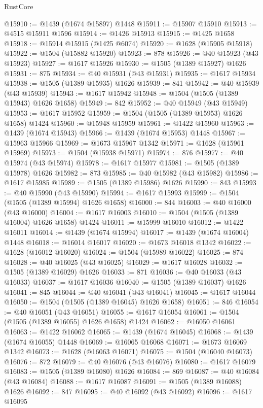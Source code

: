 \begin{lexlean}{RustCore}
\begin{coremodule}
@15910 := @1439 (@1674 @15897) @1448
@15911 := @15907 @15910
@15913 := @4515 @15911 @1596
@15914 := @1426 @15913
@15915 := @1425 @1658
@15918 := @15914 @15915 (@1425 @6074)
@15920 := @1628 (@15905 @15918)
@15922 := @1504 (@15882 @15920)
@15923 := 878
@15926 := @40 @15923 (@43 @15923)
@15927 := @1617 @15926
@15930 := @1505 (@1389 @15927) @1626
@15931 := 875
@15934 := @40 @15931 (@43 @15931)
@15935 := @1617 @15934
@15938 := @1505 (@1389 @15935) @1626
@15939 := 841
@15942 := @40 @15939 (@43 @15939)
@15943 := @1617 @15942
@15948 := @1504 (@1505 (@1389 @15943) @1626 @1658)
@15949 := 842
@15952 := @40 @15949 (@43 @15949)
@15953 := @1617 @15952
@15959 := @1504 (@1505 (@1389 @15953) @1626 @1658) @1424
@15960 := @15948 @15959
@15961 := @1422 @15960
@15963 := @1439 (@1674 @15943)
@15966 := @1439 (@1674 @15953) @1448
@15967 := @15963 @15966
@15969 := @1673 @15967 @1342
@15971 := @1628 (@15961 @15969)
@15973 := @1504 (@15938 @15971)
@15974 := 876
@15977 := @40 @15974 (@43 @15974)
@15978 := @1617 @15977
@15981 := @1505 (@1389 @15978) @1626
@15982 := 873
@15985 := @40 @15982 (@43 @15982)
@15986 := @1617 @15985
@15989 := @1505 (@1389 @15986) @1626
@15990 := 843
@15993 := @40 @15990 (@43 @15990)
@15994 := @1617 @15993
@15999 := @1504 (@1505 (@1389 @15994) @1626 @1658)
@16000 := 844
@16003 := @40 @16000 (@43 @16000)
@16004 := @1617 @16003
@16010 := @1504 (@1505 (@1389 @16004) @1626 @1658) @1424
@16011 := @15999 @16010
@16012 := @1422 @16011
@16014 := @1439 (@1674 @15994)
@16017 := @1439 (@1674 @16004) @1448
@16018 := @16014 @16017
@16020 := @1673 @16018 @1342
@16022 := @1628 (@16012 @16020)
@16024 := @1504 (@15989 @16022)
@16025 := 874
@16028 := @40 @16025 (@43 @16025)
@16029 := @1617 @16028
@16032 := @1505 (@1389 @16029) @1626
@16033 := 871
@16036 := @40 @16033 (@43 @16033)
@16037 := @1617 @16036
@16040 := @1505 (@1389 @16037) @1626
@16041 := 845
@16044 := @40 @16041 (@43 @16041)
@16045 := @1617 @16044
@16050 := @1504 (@1505 (@1389 @16045) @1626 @1658)
@16051 := 846
@16054 := @40 @16051 (@43 @16051)
@16055 := @1617 @16054
@16061 := @1504 (@1505 (@1389 @16055) @1626 @1658) @1424
@16062 := @16050 @16061
@16063 := @1422 @16062
@16065 := @1439 (@1674 @16045)
@16068 := @1439 (@1674 @16055) @1448
@16069 := @16065 @16068
@16071 := @1673 @16069 @1342
@16073 := @1628 (@16063 @16071)
@16075 := @1504 (@16040 @16073)
@16076 := 872
@16079 := @40 @16076 (@43 @16076)
@16080 := @1617 @16079
@16083 := @1505 (@1389 @16080) @1626
@16084 := 869
@16087 := @40 @16084 (@43 @16084)
@16088 := @1617 @16087
@16091 := @1505 (@1389 @16088) @1626
@16092 := 847
@16095 := @40 @16092 (@43 @16092)
@16096 := @1617 @16095

\end{coremodule}
\end{lexlean}
